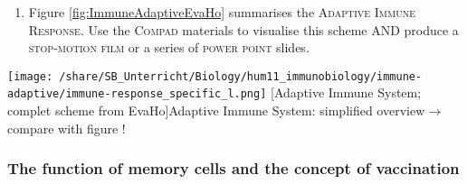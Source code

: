 \begin{enumerate}[resume, leftmargin=*]


\item Figure \ref{fig:ImmuneAdaptiveEvaHo} summarises the \textsc{Adaptive Immune Response}. Use the \textsc{Compad} materials to visualise this scheme AND produce a \textsc{stop-motion film} or a series of \textsc{power point }slides.


\end{enumerate}
\vfill
\clearpage


	\begin{minipage}{18cm}
			\texttt{[image: /share/SB\_Unterricht/Biology/hum11\_immunobiology/immune-adaptive/immune-response\_specific\_l.png]}
			[Adaptive Immune System; complet scheme from EvaHo]{Adaptive Immune System: simplified overview$\rightarrow$~  compare with figure \label{fig:ImmuneAdaptiveEvaHo}!}
		\end{minipage}


\subsubsection{The function of memory cells and the concept of vaccination}


